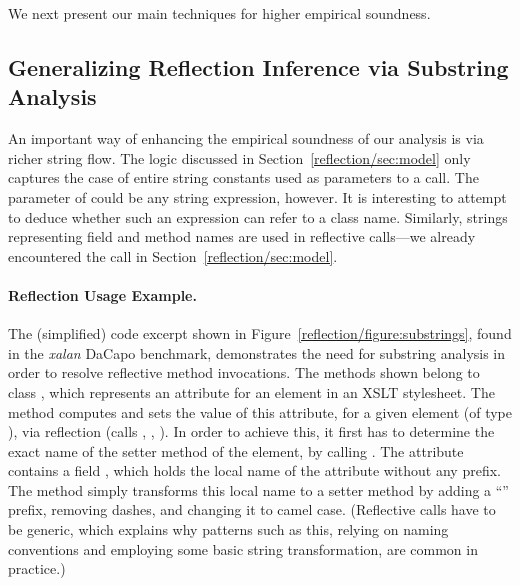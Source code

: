 We next present our main techniques for higher empirical soundness.


\subsection{Generalizing Reflection Inference via Substring Analysis}  
\label{reflection/sec:strings}

An important way of enhancing the empirical soundness of our analysis
is via richer string flow. The logic discussed in
Section~\ref{reflection/sec:model} only captures the case of entire
string constants used as parameters to a  call. The
parameter of  could be any string expression,
however. It is interesting to attempt to deduce whether such an
expression can refer to a class name. Similarly, strings representing
field and method names are used in reflective calls---we already
encountered the  call in
Section~\ref{reflection/sec:model}.

\paragraph{Reflection Usage Example.}
The (simplified) code excerpt shown in Figure~\ref{reflection/figure:substrings},
found in the \emph{xalan} DaCapo benchmark, demonstrates the need for
substring analysis in order to resolve reflective method
invocations. The methods shown belong to class
,
which represents an attribute for an element in an XSLT
stylesheet. The method  computes and sets the value
of this attribute, for a given element (of type
), via reflection (calls ,
, ). In order to achieve this, it first has
to determine the exact name of the setter method of the element, by
calling . The attribute contains a field
, which holds the local name of the attribute without any
prefix. The method simply transforms this local name to a setter
method by adding a ``'' prefix, removing dashes, and changing
it to camel case. (Reflective calls have to be generic, which explains
why patterns such as this, relying on naming conventions and employing
some basic string transformation, are common in practice.)

